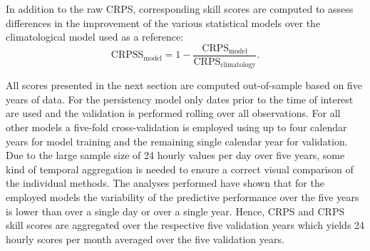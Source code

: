 \documentclass{statsoc}
\begin{document}
In addition to the raw CRPS, corresponding skill scores are computed to assess
differences in the improvement of the various statistical models over the
climatological model used as a reference:
\begin{equation} 
  \text{CRPSS}_{\text{model}} = 1 -
  \frac{\text{CRPS}_{\text{model}}}{\text{CRPS}_{\text{climatology}}}.
\end{equation}

All scores presented in the next section are computed out-of-sample based on
five years of data. For the persistency model only dates prior to the time of
interest are used and the validation is performed rolling over all
observations. For all other models a five-fold cross-validation is employed
using up to four calendar years for model training and the remaining single
calendar year for validation. Due to the large sample size of 24 hourly values
per day over five years, some kind of temporal aggregation is needed to ensure
a correct visual comparison of the individual methods. The analyses performed
have shown that for the employed models the variability of the predictive
performance over the five years is lower than over a single day or over a
single year. Hence, CRPS and CRPS skill scores are aggregated over the
respective five validation years which yields 24 hourly scores per month
averaged over the five validation years.
\end{document}
